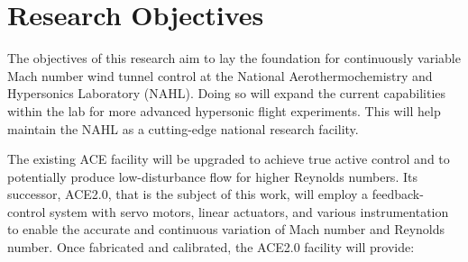 \section{Research Objectives}

The objectives of this research aim to lay the foundation for continuously variable Mach number wind tunnel control at the National Aerothermochemistry and Hypersonics Laboratory (NAHL). Doing so will expand the current capabilities within the lab for more advanced hypersonic flight experiments. This will help maintain the NAHL as a cutting-edge national research facility.

The existing ACE facility will be upgraded to achieve true active control and to potentially produce low-disturbance flow for higher Reynolds numbers. Its successor, ACE2.0, that is the subject of this work, will employ a feedback-control system with servo motors, linear actuators, and various instrumentation to enable the accurate and continuous variation of Mach number and Reynolds number. Once fabricated and calibrated, the ACE2.0 facility will provide:

